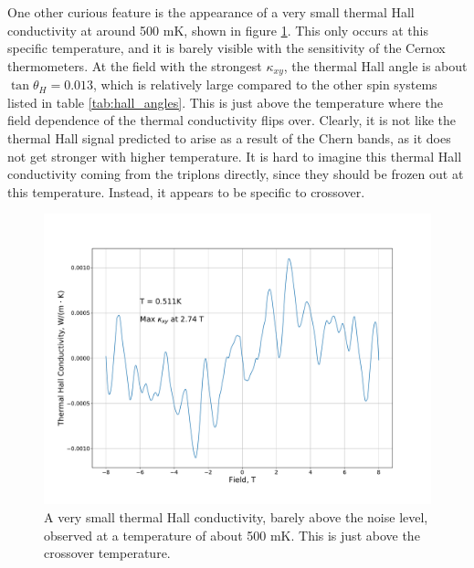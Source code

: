 \documentclass{thesis-umich}
\begin{document}
One other curious feature is the appearance of a very small thermal Hall conductivity at around 500 mK, shown in figure \ref{fig:SCBO_small_thall}. This only occurs at this specific temperature, and it is barely visible with the sensitivity of the Cernox thermometers. At the field with the strongest $\kappa_{xy}$, the thermal Hall angle is about $\tan \theta_H = 0.013$, which is relatively large compared to the other spin systems listed in table \ref{tab:hall_angles}. This is just above the temperature where the field dependence of the thermal conductivity flips over. Clearly, it is not like the thermal Hall signal predicted to arise as a result of the Chern bands, as it does not get stronger with higher temperature. It is hard to imagine this thermal Hall conductivity coming from the triplons directly, since they should be frozen out at this temperature. Instead, it appears to be specific to crossover. 

\begin{figure}
	\centering
	\caption[Small thermal Hall conductivity in SCBO]{A very small thermal Hall conductivity, barely above the noise level, observed at a temperature of about 500 mK. This is just above the crossover temperature.}
	\label{fig:SCBO_small_thall}
	\includegraphics[width=\columnwidth]{figures/SCBO_kappa_xy_vs_B.pdf}
\end{figure}
\end{document}
